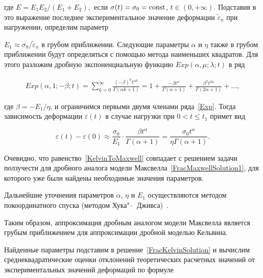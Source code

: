 \documentclass[11pt,a4paper,twoside]{article}
\begin{document}
где $E=E_{1}E_{2}/(E_{1}+E_{2}),$ если $\sigma(t)=\sigma_{0}=\rm const$, $t\in(0,+\infty)$. Подставив в это выражение последнее экспериментальное значение деформации $\tilde{\varepsilon}_{n}$ при нагружении, определим параметр	


$E_{1}\approx{\sigma_{0}}/{\tilde{\varepsilon}_{n}}$ в грубом приближении. Следующие параметры $\alpha$ и $\eta$ также в грубом приближении будут определяться с помощью метода наименьших квадратов. Для этого разложим дробную экспоненциальную функцию $Exp(\alpha,\mu;\lambda;t)$ в ряд~\cite{Ogorodnikov_Some_Special_Functions}


\begin{multline}\label{Exp}


Exp(\alpha,1;-\beta;t)=\sum^{\infty}_{k=0}\frac{(-\beta)^{k}t^{\alpha k}}{\Gamma(\alpha k+1)}=1+\frac{-\beta t^{\alpha}}{\Gamma(\alpha+1)}+\frac{\beta^{2}t^{2\alpha}}{\Gamma(2\alpha+1)}+\ldots,


\end{multline}


где $\beta=-{E_{1}}/{\eta}$, и ограничимся первыми двумя членами ряда~\eqref{Exp}. Тогда зависимость деформации $\varepsilon(t)$  в случае нагрузки при $0<t\leq t_{1}$ примет вид


\begin{equation}\label{KelvinToMaxwell}


\varepsilon(t)-\varepsilon(0)\approx\frac{\sigma_{0}}{E_{1}}\cdot\frac{\beta t^{\alpha}}{\Gamma(\alpha+1)}=\frac{\sigma_{0}t^{\alpha}}{\eta\Gamma(\alpha+1)}.


\end{equation}


Очевидно, что равенство~\eqref{KelvinToMaxwell} совпадает с решением задачи ползучести для дробного аналога модели Максвелла~\eqref{FracMaxwellSolution1}, для которого уже были найдены необходимые  значения параметров. 


Дальнейшие уточнения параметров $\alpha$, $\eta$ и $E_{1}$ осуществляются методом покоординатного спуска (методом Хука"--~Дживса)~\cite{Huk}.


Таким образом, аппроксимация дробным аналогом модели Максвелла является грубым приближением для аппроксимации дробной моделью Кельвина.


Найденные параметры подставим в решение~\eqref{FracKelvinSolution} и вычислим среднеквадратические оценки отклонений теоретических расчетных значений от экспериментальных значений деформаций по формуле 
\end{document}
